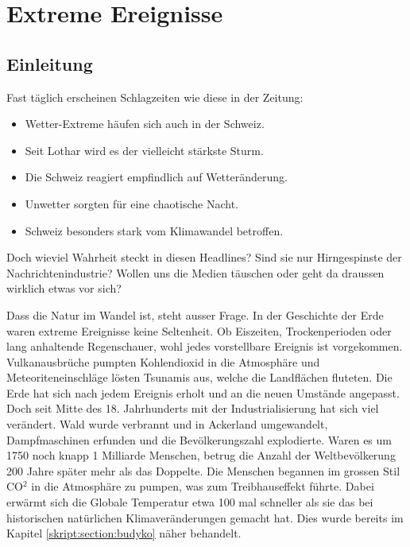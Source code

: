 %
%
%
\chapter{Extreme Ereignisse\label{chapter:thema}}
\begin{refsection}


\section{Einleitung}
Fast täglich erscheinen Schlagzeiten wie diese in der Zeitung:

\begin{itemize}
\item Wetter-Extreme häufen sich auch in der Schweiz.
\item Seit Lothar wird es der vielleicht stärkste Sturm.
\item Die Schweiz reagiert empfindlich auf Wetteränderung.
\item Unwetter sorgten für eine chaotische Nacht.
\item Schweiz besonders stark vom Klimawandel betroffen.
\end{itemize}

Doch wieviel Wahrheit steckt in diesen Headlines? Sind sie nur Hirngespinste der Nachrichtenindustrie? Wollen uns die Medien täuschen oder geht da draussen wirklich etwas vor sich?

Dass die Natur im Wandel ist, steht ausser Frage. In der Geschichte der Erde waren extreme Ereignisse keine Seltenheit. Ob Eiszeiten, Trockenperioden oder lang anhaltende Regenschauer, wohl jedes vorstellbare Ereignis ist vorgekommen. Vulkanausbrüche pumpten Kohlendioxid in die Atmosphäre und Meteoriteneinschläge lösten Tsunamis aus, welche die Landflächen fluteten. Die Erde hat sich nach jedem Ereignis erholt und an die neuen Umstände angepasst. Doch seit Mitte des 18. Jahrhunderts mit der Industrialisierung hat sich viel verändert. Wald wurde verbrannt und in Ackerland umgewandelt, Dampfmaschinen erfunden und die Bevölkerungszahl explodierte. Waren es um 1750 noch knapp 1 Milliarde Menschen, betrug die Anzahl der Weltbevölkerung 200 Jahre später mehr als das Doppelte. Die Menschen begannen im grossen Stil CO$^2$ in die Atmosphäre zu pumpen, was zum Treibhauseffekt führte. Dabei erwärmt sich die Globale Temperatur etwa 100 mal schneller als sie das bei historischen natürlichen Klimaveränderungen gemacht hat. Dies wurde bereits im Kapitel \ref{skript:section:budyko} näher behandelt. 


\end{refsection}
